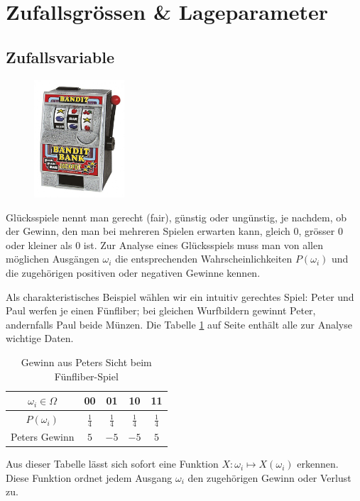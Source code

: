 \documentclass[%
11pt,%
twoside,%
titlepage,%
german,%
headsepline%
]{scrartcl}
\newcommand{\spaltenheight}{\rule{0mm}{3ex}}
\newcommand{\spaltensep}{\\[1ex]}
\begin{document}
\clearpage

\section{Zufallsgrössen \& Lageparameter}

\subsection{Zufallsvariable}
\begin{figure}
  \begin{center}
    \includegraphics[width=0.3\textwidth]{pictures/bandit}
  \end{center}
\end{figure}
Glücksspiele nennt man gerecht (fair), günstig oder ungünstig, je nachdem, ob der Gewinn, den man bei mehreren Spielen erwarten kann, gleich $0$, grösser $0$ oder kleiner als $0$ ist. Zur Analyse eines Glücksspiels muss man von allen möglichen Ausgängen $\omega_i$ die entsprechenden Wahrscheinlichkeiten $P(\omega_i)$ und die zugehörigen positiven oder negativen Gewinne kennen.

\begin{bsp}
Als charakteristisches Beispiel wählen wir ein intuitiv gerechtes Spiel: Peter und Paul werfen je einen Fünfliber; bei gleichen Wurfbildern gewinnt Peter, andernfalls Paul beide Münzen.
Die Tabelle \ref{tab:5liber} auf Seite \pageref{tab:5liber} enthält alle zur Analyse wichtige Daten.

\begin{table}
\begin{center}
\begin{tabular}{|c|c|c|c|c|}
\hline
\rowcolor{Gray}\spaltenheight $\omega_i\in\Omega$ & 00 & 01 & 10 & 11\spaltensep \hline
\rowcolor{lightyellow}\spaltenheight $P(\omega_i)$ & $\frac{1}{4}$ & $\frac{1}{4}$ & $\frac{1}{4}$ & $\frac{1}{4}$\spaltensep \hline
\rowcolor{Gray}\spaltenheight Peters Gewinn & $5$ & $-5$ & $-5$ & $5$\spaltensep \hline
\end{tabular}
\end{center}
\caption{Gewinn aus Peters Sicht beim Fünfliber-Spiel}\label{tab:5liber}
\end{table}
\end{bsp}
Aus dieser Tabelle lässt sich sofort eine Funktion $X:\omega_i\mapsto X(\omega_i)$
erkennen. Diese Funktion ordnet jedem Ausgang $\omega_i$ den zugehörigen Gewinn oder Verlust zu.
\end{document}
